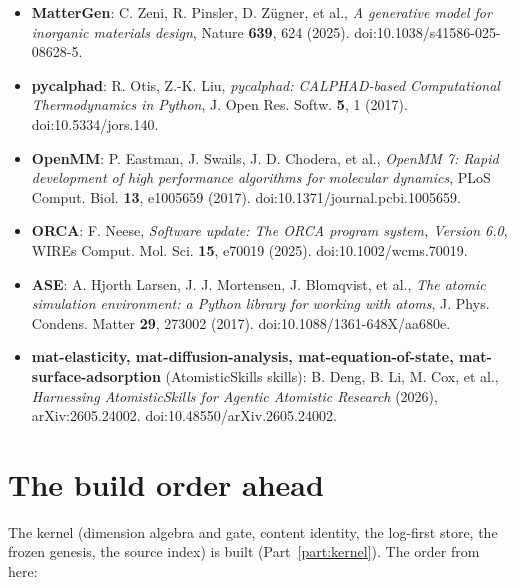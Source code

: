 \documentclass[11pt,a4paper]{article}
\begin{document}
\begin{itemize}[leftmargin=1.4em, itemsep=0.25em]
        Y. Liu, \emph{Crystal Structure Prediction by Joint Equivariant
        Diffusion}, NeurIPS 36 (2023), arXiv:2309.04475 (the map uses the
        space-group-constrained variant DiffCSP++, arXiv:2402.03992).
  \item \textbf{MatterGen}: C. Zeni, R. Pinsler, D. Z\"ugner, et al.,
        \emph{A generative model for inorganic materials design}, Nature
        \textbf{639}, 624 (2025). doi:10.1038/s41586-025-08628-5.
  \item \textbf{pycalphad}: R. Otis, Z.-K. Liu, \emph{pycalphad: CALPHAD-based
        Computational Thermodynamics in Python}, J. Open Res. Softw. \textbf{5},
        1 (2017). doi:10.5334/jors.140.
  \item \textbf{OpenMM}: P. Eastman, J. Swails, J. D. Chodera, et al.,
        \emph{OpenMM 7: Rapid development of high performance algorithms for
        molecular dynamics}, PLoS Comput. Biol. \textbf{13}, e1005659 (2017).
        doi:10.1371/journal.pcbi.1005659.
  \item \textbf{ORCA}: F. Neese, \emph{Software update: The ORCA program system,
        Version 6.0}, WIREs Comput. Mol. Sci. \textbf{15}, e70019 (2025).
        doi:10.1002/wcms.70019.
  \item \textbf{ASE}: A. Hjorth Larsen, J. J. Mortensen, J. Blomqvist, et al.,
        \emph{The atomic simulation environment: a Python library for working
        with atoms}, J. Phys. Condens. Matter \textbf{29}, 273002 (2017).
        doi:10.1088/1361-648X/aa680e.
  \item \textbf{mat-elasticity, mat-diffusion-analysis, mat-equation-of-state,
        mat-surface-adsorption} (AtomisticSkills skills): B. Deng, B. Li,
        M. Cox, et al., \emph{Harnessing AtomisticSkills for Agentic Atomistic
        Research} (2026), arXiv:2605.24002. doi:10.48550/arXiv.2605.24002.
\end{itemize}

\section{The build order ahead}
\label{sec:status-buildorder}

The kernel (dimension algebra and gate, content identity, the log-first store,
the frozen genesis, the source index) is built (Part~\ref{part:kernel}). The
order from here:
\end{document}
